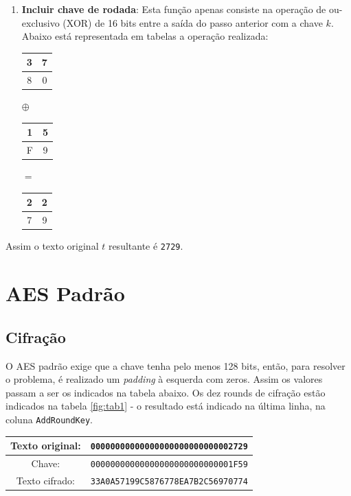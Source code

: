 \documentclass{article}
\begin{document}
\begin{enumerate}
    \item \textbf{Incluir chave de rodada}: Esta função apenas consiste na
    operação de ou-exclusivo (XOR) de 16 bits entre a saída do passo anterior
    com a chave $k$. Abaixo está representada em tabelas a operação realizada:
    \begin{center}
        \begin{tabular}{|c|c|}
            \hline
            3 & 7 \\
            \hline
            8 & 0 \\
            \hline
        \end{tabular}
        $\oplus$
        \begin{tabular}{|c|c|}
            \hline
            1 & 5 \\
            \hline
            F & 9 \\
            \hline
        \end{tabular}
        $=$
        \begin{tabular}{|c|c|}
            \hline
            2 & 2  \\
            \hline
            7 & 9 \\
            \hline
        \end{tabular}
    \end{center}
\end{enumerate}
Assim o texto original $t$ resultante é \texttt{2729}.

\section{AES Padrão}
\subsection{Cifração}
O AES padrão exige que a chave tenha pelo menos 128 bits, então, para resolver
o problema, é realizado um \textit{padding} à esquerda com zeros. Assim os
valores passam a ser os indicados na tabela abaixo. Os dez rounds de cifração
estão indicados na tabela \ref{fig:tab1} - o resultado está indicado na última
linha, na coluna \texttt{AddRoundKey}\footnotemark.
\begin{center}
    \begin{tabular}{|c|c|}
        \hline
        Texto original: & \texttt{00000000000000000000000000002729} \\
        \hline
        Chave: & \texttt{00000000000000000000000000001F59} \\
        \hline
        Texto cifrado: & \texttt{33A0A57199C5876778EA7B2C56970774} \\
        \hline
    \end{tabular}
\end{center}
\end{document}
